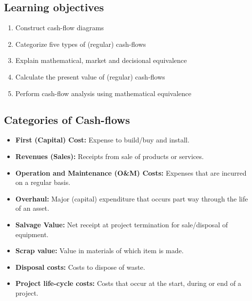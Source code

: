 \subsection{Learning objectives}
\begin{definition}
    \begin{enumerate}
        \item Construct cash-flow diagrams
        \item Categorize five types of (regular) cash-flows
        \item Explain mathematical, market and decisional equivalence
        \item Calculate the present value of (regular) cash-flows
        \item Perform cash-flow analysis using mathematical equivalence
    \end{enumerate}
\end{definition}

\subsection{Categories of Cash-flows}
\begin{terminology}
    \begin{itemize}
        \item \textbf{First (Capital) Cost:} Expense to build/buy and install.
        \item \textbf{Revenues (Sales):} Receipts from sale of products or services.
        \item \textbf{Operation and Maintenance (O\&M) Costs:} Expenses that are incurred on a regular basis. 
        \item \textbf{Overhaul:} Major (capital) expenditure that occurs part way through the life of an asset. 
        \item \textbf{Salvage Value:} Net receipt at project termination for sale/disposal of equipment.
        \item \textbf{Scrap value:} Value in materials of which item is made.
        \item \textbf{Disposal costs:} Costs to dispose of waste.
        \item \textbf{Project life-cycle costs:} Costs that occur at the start, during or end of a project. 
    \end{itemize}
\end{terminology}

